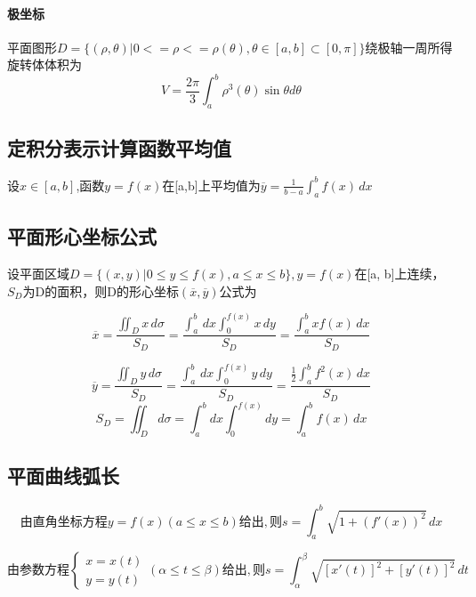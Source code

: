\paragraph{极坐标}
平面图形\(D = \{(\rho, \theta) | 0 <= \rho <= \rho(\theta), \theta \in [a, b] \subset [0, \pi]\}\)绕极轴一周所得旋转体体积为\[V = \dfrac{2\pi}{3}\int_a^b\rho^3(\theta)\sin\theta d\theta\]


\subsection{定积分表示计算函数平均值}

设\(x \in [a, b]\),函数\(y = f(x)\)在[a,b]上平均值为\(\overline{y} = \frac{1}{b- a} \int_{a}^{b} f(x) \,dx\)


\subsection{平面形心坐标公式}

设平面区域\(D = \{ (x, y) | 0 \leq y \leq f(x), a \leq x \leq b \}, y = f(x)\)在[a, b]上连续，\(S_D\)为D的面积，则D的形心坐标\((\overline{x}, \overline{y})\)公式为

\begin{displaymath}
\overline{x} = \frac{\iint_{D} x \,d\sigma}{S_D} = 
\frac{\int_{a}^{b} \,dx \int_{0}^{f(x)} x \,dy}{S_D} =
\frac{\int_{a}^{b} xf(x) \,dx}{S_D}
\end{displaymath}

\begin{displaymath}
\overline{y} = \frac{\iint_{D} y \,d\sigma}{S_D} = 
\frac{\int_{a}^{b} \,dx \int_{0}^{f(x)} y \,dy}{S_D} =
\frac{\frac{1}{2}\int_{a}^{b} f^2(x) \,dx}{S_D}
\end{displaymath}
\[S_D = \iint_{D}d\sigma = \int_{a}^{b}dx \int_{0}^{f(x)}dy = \int_{a}^{b} f(x)\,dx\]


\subsection{平面曲线弧长}

\begin{displaymath}
由直角坐标方程y = f(x)(a \leq x \leq b)给出,
则s = \int_{a}^{b} \sqrt{1 + (f'(x))^2} \,dx
\end{displaymath}

\begin{displaymath}
由参数方程
\begin{cases}
x = x(t) \\
y = y(t)
\end{cases}
(\alpha \leq t \leq \beta)给出,
则s = \int_{\alpha}^{\beta} \sqrt{[x'(t)]^2 + [y'(t)]^2} \,dt
\end{displaymath}

